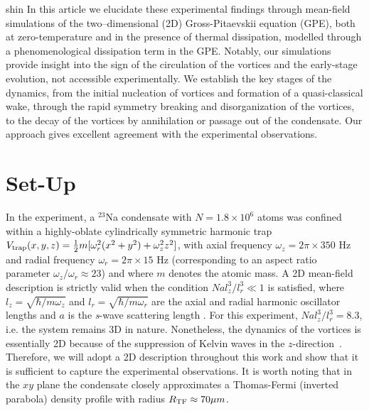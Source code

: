 \begin{chapter}{\label{cha:shin}shin}
 In this article we elucidate these experimental
findings through mean-field simulations of the two--dimensional (2D) Gross-Pitaevskii equation (GPE), both at zero-temperature and in the presence of 
thermal dissipation, modelled through a phenomenological dissipation term in 
the GPE.  Notably, our simulations provide insight into the sign of the circulation of the vortices and the early-stage evolution, not accessible experimentally.  We establish the key stages of the dynamics, from the initial nucleation of vortices and formation of a quasi-classical wake, through the rapid symmetry breaking and disorganization of the vortices, to the decay of the vortices by annihilation or passage out of the condensate.  Our approach gives excellent agreement with the experimental observations.  

\section{Set-Up}
In the experiment, a $^{23}$Na condensate with $N=1.8\times 10^6$ atoms was confined within a highly-oblate cylindrically symmetric harmonic trap $V_{\rm{trap}}(x,y,z)=\frac{1}{2}m[\omega_r^2 (x^2+y^2) +\omega_z^2 z^2 ]$, with axial frequency $\omega_z=2 \pi \times 350$ Hz and radial frequency $\omega_r=2\pi \times 15$ Hz (corresponding to an aspect ratio parameter $\omega_z/\omega_r \approx 23$) and where $m$ denotes the atomic mass.  
A 2D mean-field description is strictly valid when 
the condition $N a l_z^3/l_r^3 \ll 1$ is satisfied, 
where $l_z=\sqrt{\hbar/m \omega_z}$ and $l_r=\sqrt{\hbar/m\omega_r}$ 
are the axial and radial harmonic oscillator lengths and $a$ is 
the {\it s}-wave scattering length \cite{delgado,parker2008}.  
For this experiment, $N a l_z^3/l_r^3=8.3$, i.e. the system remains 
3D in nature.   Nonetheless, the dynamics of the vortices is essentially 2D 
because of the suppression of Kelvin waves in 
the $z$-direction~\citep{jackson_proukakis_09}.  
Therefore, we will adopt a 2D description throughout this work and 
show that it is sufficient to capture the experimental observations.  
It is worth noting that in the $xy$ plane the condensate 
closely approximates a Thomas-Fermi (inverted parabola) density 
profile with radius $R_{\rm TF}\approx70 \mu m$.


\end{chapter}
